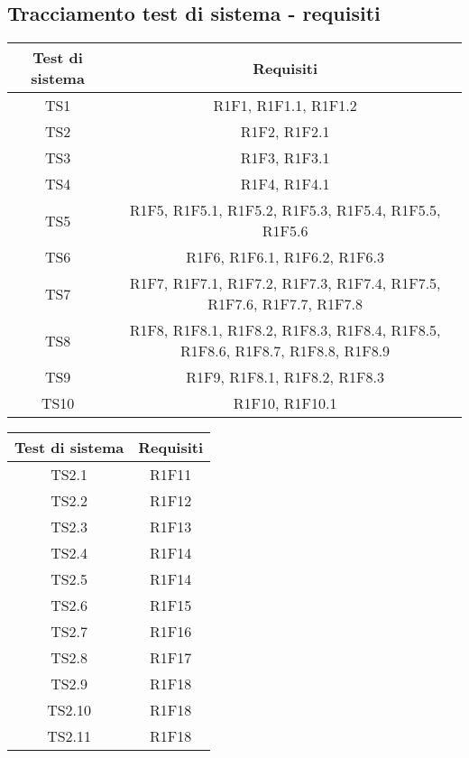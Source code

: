 \subsection{Tracciamento test di sistema - requisiti}

\begin{center}
	\begin{longtable}{|c|c|}
	\hline
	\rowcolor{lighter-grayer}
	\textbf{Test di sistema} & \textbf{Requisiti} \\
	\hline
	\endfirsthead



	\hline
	TS1 & R1F1, R1F1.1, R1F1.2  \\
	TS2 & R1F2, R1F2.1 \\
	TS3 & R1F3, R1F3.1 \\
	TS4 & R1F4, R1F4.1 \\
	TS5 & R1F5, R1F5.1, R1F5.2, R1F5.3, R1F5.4, R1F5.5, R1F5.6 \\
	TS6 & R1F6, R1F6.1, R1F6.2, R1F6.3 \\
	TS7 & R1F7, R1F7.1, R1F7.2, R1F7.3, R1F7.4, R1F7.5, R1F7.6, R1F7.7, R1F7.8 \\
	TS8 & R1F8, R1F8.1, R1F8.2, R1F8.3, R1F8.4, R1F8.5, R1F8.6, R1F8.7, R1F8.8, R1F8.9 \\
	TS9 & R1F9, R1F8.1, R1F8.2, R1F8.3 \\
	TS10 & R1F10, R1F10.1 \\

	
	\hline
	
	

	\hline

	\end{longtable}
\end{center}

\begin{center}
	\begin{longtable}{|c|c|}
	\hline
	\rowcolor{lighter-grayer}
	\textbf{Test di sistema} & \textbf{Requisiti} \\
	\hline
	\endfirsthead


	
	\hline
	TS2.1 & R1F11  \\
	TS2.2 & R1F12 \\
	TS2.3 & R1F13 \\
	TS2.4 & R1F14 \\
	TS2.5 & R1F14 \\
	TS2.6 & R1F15 \\
	TS2.7 & R1F16 \\
	TS2.8 & R1F17 \\
	TS2.9 & R1F18 \\
	TS2.10 & R1F18 \\
	TS2.11 & R1F18 \\
	\hline

	\end{longtable}
\end{center}


